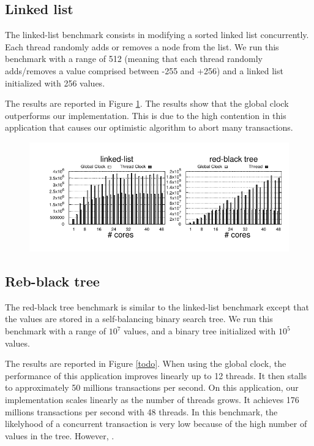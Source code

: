 \subsection{Linked list}

The linked-list benchmark consists in modifying a sorted linked list
concurrently. Each thread randomly adds or removes a node from the
list. We run this benchmark with a range of 512 (meaning that each
thread randomly adds/removes a value comprised between -255 and +256)
and a linked list initialized with 256 values.

The results are reported in Figure \ref{fig:benchmarking:llrb}.
%
The results show that the global clock outperforms our
implementation. This is due to the high contention in this application
that causes our optimistic algorithm to abort  many transactions.

\begin{figure}[!t]
	\centering
	\includegraphics[scale = 1.0]{results/intset/ll-rb.pdf}
	\caption{\label{fig:benchmarking:llrb}}
\end{figure}

\subsection{Reb-black tree}

The red-black tree benchmark is similar to the linked-list benchmark
except that the values are stored in a self-balancing binary search
tree. We run this benchmark with a range of $10^7$ values, and a
binary tree initialized with $10^5$ values.

The results are reported in Figure \ref{todo}.
%
When using the global clock, the performance of this application
improves linearly up to 12 threads. It then stalls to approximately 50
millions transactions per second.
%
On this application, our implementation scales linearly as the number
of threads grows. It achieves 176 millions transactions per second
with 48 threads.
%
In this benchmark, the likelyhood of a concurrent transaction is very
low because of the high number of values in the tree. However,
.
%
